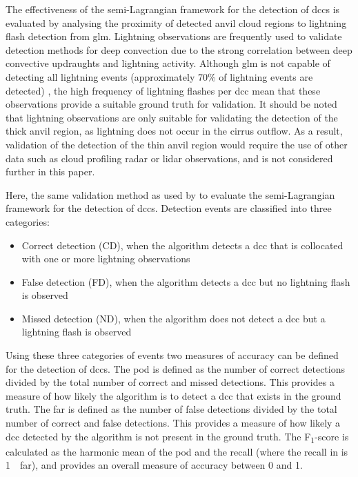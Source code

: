 The effectiveness of the semi-Lagrangian framework for the detection of \acrshort{dcc}s is evaluated by analysing the proximity of detected anvil cloud regions to lightning flash detection from \acrshort{glm}.
Lightning observations are frequently used to validate detection methods for deep convection \citep[e.g.][]{zinner_validation_2013, muller_novel_2019} due to the strong correlation between deep convective updraughts and lightning activity.
Although \acrshort{glm} is not capable of detecting all lightning events (approximately 70\% of lightning events are detected) \citep{peterson_removing_2020}, the high frequency of lightning flashes per \acrshort{dcc} mean that these observations provide a suitable ground truth for validation.
It should be noted that lightning observations are only suitable for validating the detection of the thick anvil region, as lightning does not occur in the cirrus outflow.
As a result, validation of the detection of the thin anvil region would require the use of other data such as cloud profiling radar or lidar observations, and is not considered further in this paper.


Here, the same validation method as used by \citet{muller_novel_2019} to evaluate the semi-Lagrangian framework for the detection of \acrshort{dcc}s.
Detection events are classified into three categories:

\begin{itemize}
    \item Correct detection (CD), when the algorithm detects a \acrshort{dcc} that is collocated with one or more lightning observations
    \item False detection (FD), when the algorithm detects a \acrshort{dcc} but no lightning flash is observed
    \item Missed detection (ND), when the algorithm does not detect a \acrshort{dcc} but a lightning flash is observed
\end{itemize}

Using these three categories of events two measures of accuracy can be defined for the detection of \acrshort{dcc}s.
The \acrfull{pod} is defined as the number of correct detections divided by the total number of correct and missed detections.
This provides a measure of how likely the algorithm is to detect a \acrshort{dcc} that exists in the ground truth.
The \acrfull{far} is defined as the number of false detections divided by the total number of correct and false detections.
This provides a measure of how likely a \acrshort{dcc} detected by the algorithm is not present in the ground truth.
The F\textsubscript{1}-score is calculated as the harmonic mean of the \acrshort{pod} and the recall (where the recall in is 1~\textminus~\acrshort{far}), and provides an overall measure of accuracy between 0 and 1.

